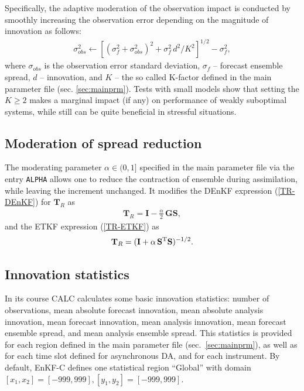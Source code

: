 \documentclass[11pt]{report}
\newcommand{\mb} {\mathbf}
\newcommand{\T}{^{\tiny \mathrm T}}
\begin{document}
Specifically, the adaptive moderation of the observation impact is conducted by smoothly increasing the observation error depending on the magnitude of innovation as follows:
\begin{align*}
  \sigma^2_{obs} \leftarrow \left[(\sigma_{f}^2 + \sigma_{obs}^2)^2 + \sigma_f^2 \, d^2 / K^2\right]^{1/2} - \sigma_f^2,
\end{align*}
where $\sigma_{obs}$ is the observation error standard deviation, $\sigma_f$ -- forecast ensemble spread, $d$ -- innovation, and $K$ -- the so called K-factor defined in the main parameter file (sec. \ref{sec:mainprm}).
Tests with small models show that setting the $K \ge 2$ makes a marginal impact (if any) on performance of weakly suboptimal systems, while still can be quite beneficial in stressful situations.

\subsection{Moderation of spread reduction}

The moderating parameter $\alpha \in (0, 1]$ specified in the main parameter file via the entry \verb|ALPHA| allows one to reduce the contraction of ensemble during assimilation, while leaving the increment unchanged.
It modifies the DEnKF expression (\ref{TR-DEnKF}) for $\mb T_R$ as
\begin{align*}
  \mb T_R = \mb I - \frac{\alpha}{2} \, \mb G \mb S,
\end{align*}
and the ETKF expression (\ref{TR-ETKF}) as
\begin{align*}
  \mb T_R = (\mb I + \alpha \, \mb S\T \mb S)^{-1/2}.
\end{align*}

\subsection{Innovation statistics}

In its course CALC calculates some basic innovation statistics: number of observations, mean absolute forecast innovation, mean absolute analysis innovation, mean forecast innovation, mean analysis innovation, mean forecast ensemble spread, and mean analysis ensemble spread.
This statistics is provided for each region defined in the main parameter file (sec.~\ref{sec:mainprm}), as well as for each time slot defined for asynchronous DA, and for each instrument.
By default, EnKF-C defines one statistical region ``Global'' with domain $[x_1,x_2] = [-999,999], [y_1,y_2] = [-999,999]$.
\end{document}
